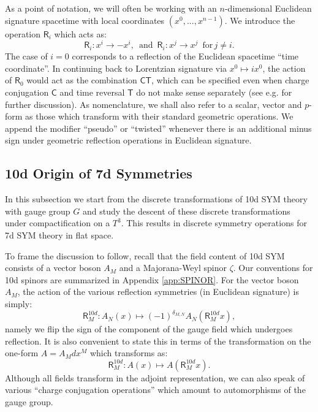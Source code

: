 \documentclass[12pt]{article}%
\numberwithin{equation}{section}
\renewcommand{\(}{\left(}
\renewcommand{\)}{\right)}
\renewcommand{\[}{\left[}
\renewcommand{\]}{\right]}
\begin{document}
As a point of notation, we will often be working with an $n$-dimensional Euclidean signature
spacetime with local coordinates $(x^0 ,..., x^{n-1})$. We introduce the operation
$\mathsf{R}_i$ which acts as:
\begin{equation}
\mathsf{R}_i : x^i \rightarrow -x^i, \,\,\,\text{and} \,\,\, \mathsf{R}_i : x^{j} \rightarrow x^{j} \,\,\,\text{for} \, j \neq i.
\end{equation}
The case of $i = 0$ corresponds to a reflection of the Euclidean spacetime ``time coordinate''.
In continuing back to Lorentzian signature via $x^{0} \mapsto i x^{0} $, the action of $\mathsf{R}_0$
would act as the combination $\mathsf{CT}$, which can be specified even when charge conjugation $\mathsf{C}$ and time
reversal $\mathsf{T}$ do not make sense separately (see e.g. \cite{Witten:2015aba} for further discussion).
As nomenclature, we shall also refer to a scalar, vector and $p$-form as those which transform with their
standard geometric operations. We append the modifier ``pseudo'' or ``twisted'' whenever there is an additional
minus sign under geometric reflection operations in Euclidean signature.

\subsection{10d Origin of 7d Symmetries}

In this subsection we start from the discrete transformations
of 10d SYM theory with gauge group $G$ and study the descent
of these discrete transformations under compactification on
a $T^3$. This results in discrete symmetry operations for 7d SYM theory
in flat space.

To frame the discussion to follow, recall that the
field content of 10d SYM consists of a vector boson $A_M$ and a Majorana-Weyl spinor $\zeta$.
Our conventions for 10d spinors are summarized in Appendix \ref{app:SPINOR}.
For the vector boson $A_M$, the action of the various reflection symmetries (in Euclidean signature) is simply:
\begin{equation}
\mathsf{R}^{10d}_M : A_{N}(x) \mapsto (-1)^{\delta_{M,N}}A_{N}(\mathsf{R}^{10d}_M x),
\end{equation}
namely we flip the sign of the component of the gauge field which undergoes reflection. It is also convenient
to state this in terms of the transformation on the one-form $A = A_M dx^M$ which transforms as:
\begin{equation}
\mathsf{R}^{10d}_M : A(x) \mapsto A(\mathsf{R}^{10d}_M x).
\end{equation}
Although all fields transform in the adjoint representation, we can also speak of various
``charge conjugation operations'' which amount to automorphisms of the gauge group.
\end{document}
